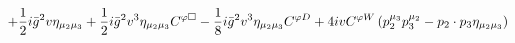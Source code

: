 %
\begin{dmath*}
%
  +  \frac{1}{2} i {\bar g}{}^2 v\eta_{\mu_2 \mu_3}  +  \frac{1}{2} i {\bar g}{}^2 v^3\eta_{\mu_2 \mu_3} C^{ \varphi  \Box}  -  \frac{1}{8} i {\bar g}{}^2 v^3\eta_{\mu_2 \mu_3} C^{ \varphi  D}  +  4 i vC^{ \varphi  W} \left(p_2^{\mu_3} p_3^{\mu_2} - p_{2}\nobreak\cdot\nobreak{}p_{3} \eta_{\mu_2 \mu_3}\right)
%
\end{dmath*}
%
